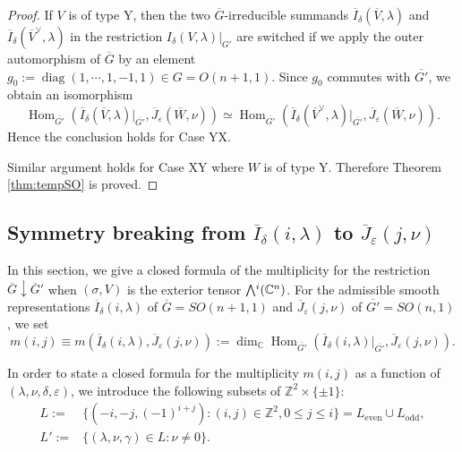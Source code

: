 \begin{proof}
If $V$ is of type Y, 
 then the two $\overline G$-irreducible summands
 $\overline{I}_{\delta}(\overline V, \lambda)$
 and $\overline{I}_{\delta}(\overline V^{\vee}, \lambda)$
 in the restriction $I_{\delta}(V, \lambda)|_{G'}$ are switched 
 if we apply the outer automorphism of $\overline G$
 by an element $g_0:={\operatorname{diag}}(1,\cdots,1,-1,1) \in G=O(n+1,1)$.  
Since $g_0$ commutes with $\overline {G'}$, 
 we obtain an isomorphism
\[
  {\operatorname{Hom}}_{\overline{G'}} 
  (\overline{I}_{\delta}(\overline V, \lambda)|_{\overline {G'}}, 
   \overline{J}_{\varepsilon}(\overline W, \nu))
  \simeq
  {\operatorname{Hom}}_{\overline{G'}} 
  (\overline{I}_{\delta}(\overline V^{\vee}, \lambda)|_{\overline {G'}}, 
   \overline{J}_{\varepsilon}(\overline W, \nu)).
\]
Hence the conclusion holds
 for Case YX. 



Similar argument holds for Case XY
 where $W$ is of type Y.  
Therefore Theorem \ref{thm:tempSO} is proved.  
\end{proof}



\subsection{Symmetry breaking from
 $\overline I_{\delta}(i,\lambda)$ to $\overline J_{\varepsilon}(j,\nu)$}
\label{subsec:SBOpsSO}



In this section, 
 we give a closed formula
 of the multiplicity
 for the restriction $\overline G \downarrow \overline G'$
 when $(\sigma,V)$ is the exterior tensor $\Exterior^i({\mathbb{C}}^n)$.  
For the admissible smooth representations
 ${\overline{I}}_{\delta}(i,\lambda)$ of ${\overline{G}}=SO(n+1,1)$
 and ${\overline{J}}_{\varepsilon}(j,\nu)$ of ${\overline{G'}}=SO(n,1)$, 
 we set
\[
   m(i,j)
   \equiv m({\overline{I}}_{\delta}(i,\lambda), {\overline{J}}_{\varepsilon}(j,\nu))
   :=
   \dim_{\mathbb{C}} \operatorname{Hom}_{{\overline{G'}}}
    ({\overline{I}}_{\delta}(i,\lambda)|_{{\overline{G'}}}, {\overline{J}}_{\varepsilon}(j,\nu)).  
\]
%



In order to state a closed formula
 for the multiplicity $m(i,j)$
 as a function of $(\lambda, \nu,\delta, \varepsilon)$, 
 we introduce the following subsets of ${\mathbb{Z}}^2 \times \{\pm 1\}$:
\begin{align*}
  L:=&\{(-i,-j, (-1)^{i+j}): (i,j) \in {\mathbb{Z}}^2, 0 \le j \le i \}
    = L_{\operatorname{even}} \cup L_{\operatorname{odd}}, 
\\
  L':=&\{(\lambda,\nu,\gamma) \in L: \nu \ne 0 \}.  
\end{align*}

